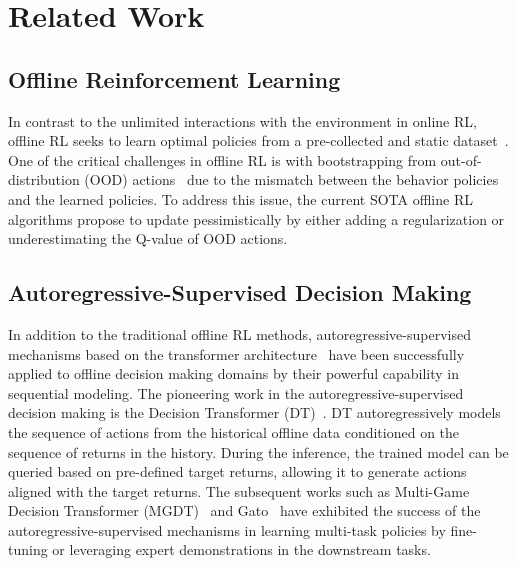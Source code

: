 \documentclass[10pt]{article}
\begin{document}
\section{Related Work}
\label{appendix_related_work}
\subsection{Offline Reinforcement Learning}
In contrast to the unlimited interactions with the environment in online RL, offline RL seeks to learn optimal policies from a pre-collected and static dataset~\citep{fujimoto2019benchmarking, levine2020offline, kumar2020conservative, kostrikov2021offline, chen2024domain}. One of the critical challenges in offline RL is with bootstrapping from out-of-distribution (OOD) actions~\citep{levine2020offline, kumar2020conservative, xu2022policy, liu2024beyond} due to the mismatch between the behavior policies and the learned policies. To address this issue, the current SOTA offline RL algorithms propose to update pessimistically by either adding a regularization or underestimating the Q-value of OOD actions.
\subsection{Autoregressive-Supervised Decision Making}
In addition to the traditional offline RL methods, autoregressive-supervised mechanisms based on the transformer architecture~\citep{vaswani2017attention} have been successfully applied to offline decision making domains by their powerful capability in sequential modeling.
The pioneering work in the autoregressive-supervised decision making is the Decision Transformer (DT)~\citep{chen2021decision}.
DT autoregressively models the sequence of actions from the historical offline data conditioned on the sequence of returns in the history.
During the inference, the trained model can be queried based on pre-defined target returns, allowing it to generate actions aligned with the target returns.
The subsequent works such as Multi-Game Decision Transformer (MGDT)~\citep{lee2022multi} and Gato~\citep{reed2022generalist} have exhibited the success of the autoregressive-supervised mechanisms in learning multi-task policies by fine-tuning or leveraging expert demonstrations in the downstream tasks.
\end{document}
